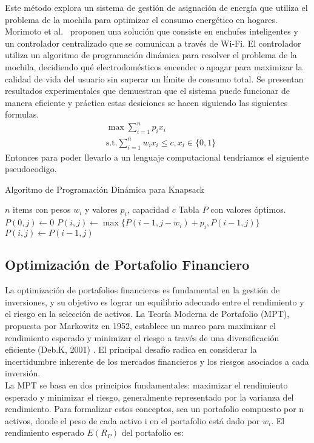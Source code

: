 \documentclass[9pt,a4paper,twoside]{rho-class/rho}
\begin{document}
            Este método explora un sistema de gestión de asignación de energía que utiliza el problema de la mochila para optimizar el consumo energético en hogares.  Morimoto et al.~\cite{Morimoto2014} proponen una solución que consiste en enchufes inteligentes y un controlador centralizado que se comunican a través de Wi-Fi. El controlador utiliza un algoritmo de programación dinámica para resolver el problema de la mochila, decidiendo qué electrodomésticos encender o apagar para maximizar la calidad de vida del usuario sin superar un límite de consumo total. Se presentan resultados experimentales que demuestran que el sistema puede funcionar de manera eficiente y práctica estas desiciones se hacen siguiendo las siguientes formulas.
            \begin{align}
                &\max \sum_{i=1}^{n} p_ix_i \\
                &\text{s.t.} \sum_{i=1}^{n} w_ix_i \leq c, x_i \in \{0,1\}
            \end{align}
            Entonces para poder llevarlo a un lenguaje computacional tendriamos el siguiente pseudocodigo.
            \begin{algorithm}
            \caption{Algoritmo de Programación Dinámica para Knapsack}
            \begin{algorithmic}[1]
            \REQUIRE $n$ items con pesos $w_i$ y valores $p_i$, capacidad $c$
            \ENSURE Tabla $P$ con valores óptimos.
                \STATE $P(0,j) \gets 0$
            \ENDFOR
                        \STATE $P(i,j) \gets \max\{P(i-1,j-w_i) + p_i, P(i-1,j)\}$
                    \ELSE
                        \STATE $P(i,j) \gets P(i-1,j)$
                    \ENDIF
                \ENDFOR
            \ENDFOR
            \end{algorithmic}
            \end{algorithm}

        \subsection{Optimización de Portafolio Financiero}
            La optimización de portafolios financieros es fundamental en la gestión de inversiones, y su objetivo es lograr un equilibrio adecuado entre el rendimiento y el riesgo en la selección de activos. La Teoría Moderna de Portafolio (MPT), propuesta por Markowitz en 1952, establece un marco para maximizar el rendimiento esperado y minimizar el riesgo a través de una diversificación eficiente (Deb.K, 2001) \cite{Deb2001}. El principal desafío radica en considerar la incertidumbre inherente de los mercados financieros y los riesgos asociados a cada inversión.
            \\
            La MPT se basa en dos principios fundamentales: maximizar el rendimiento esperado y minimizar el riesgo, generalmente representado por la varianza del rendimiento. Para formalizar estos conceptos, sea un portafolio compuesto por n activos, donde el peso de cada activo i en el portafolio está dado por ${w}_{i}$. El rendimiento esperado $E\left({R}_{P}\right)$ del portafolio es:
        
\end{document}
